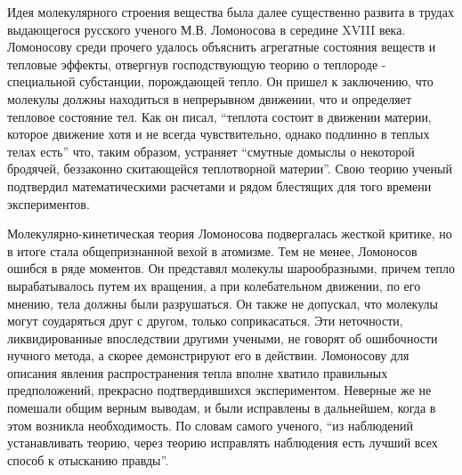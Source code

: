 Идея молекулярного строения вещества была далее существенно развита в трудах выдающегося русского ученого М.В. Ломоносова в середине XVIII века.
Ломоносову среди прочего удалось объяснить агрегатные состояния веществ и тепловые эффекты, отвергнув господствующую теорию о теплороде - специальной субстанции, порождающей тепло.
Он пришел к заключению, что молекулы должны находиться в непрерывном движении, что и определяет тепловое состояние тел.
Как он писал, ``теплота состоит в движении материи, которое движение хотя и не всегда чувствительно, однако подлинно в теплых телах есть'' что, таким образом, устраняет ``смутные домыслы о некоторой бродячей, беззаконно скитающейся теплотворной материи''.
Свою теорию ученый подтвердил математическими расчетами и рядом блестящих для того времени экспериментов.

Молекулярно-кинетическая теория Ломоносова подвергалась жесткой критике, но в итоге стала общепризнанной вехой в атомизме.
Тем не менее, Ломоносов ошибся в ряде моментов.
Он представял молекулы шарообразными, причем тепло вырабатывалось путем их вращения, а при колебательном движении, по его мнению, тела должны были разрушаться. 
Он также не допускал, что молекулы могут соударяться друг с другом, только соприкасаться.
Эти неточности, ликвидированные впоследствии другими учеными, не говорят об ошибочности нучного метода, а скорее демонстрируют его в действии.
Ломоносову для описания явления распространения тепла вполне хватило правильных предположений, прекрасно подтвердившихся экспериментом.
Неверные же не помешали общим верным выводам, и были исправлены в дальнейшем, когда в этом возникла необходимость.
По словам самого ученого, ``из наблюдений устанавливать теорию, через теорию исправлять наблюдения есть лучший всех способ к отысканию правды''.

